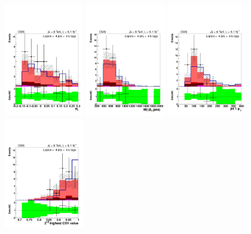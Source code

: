 \begin{figure}[hbtp]
 \begin{center}
  \includegraphics[width=0.31\textwidth]{Figures/Analysis_1_Diagrams/d2MCPlots_h1_cut7_j4_t4_Combined_HtWgt.pdf}
   \includegraphics[width=0.31\textwidth]{Figures/Analysis_1_Diagrams/d2MCPlots_dijet_mass_of_everything_cut7_j4_t4_Combined_HtWgt.pdf}
   \includegraphics[width=0.31\textwidth]{Figures/Analysis_1_Diagrams/d2MCPlots_first_jet_pt_cut7_j4_t4_Combined_HtWgt.pdf}
   \includegraphics[width=0.31\textwidth]{Figures/Analysis_1_Diagrams/d2MCPlots_second_highest_btag_cut7_j4_t4_Combined_HtWgt.pdf}

\end{center}
\end{figure}
